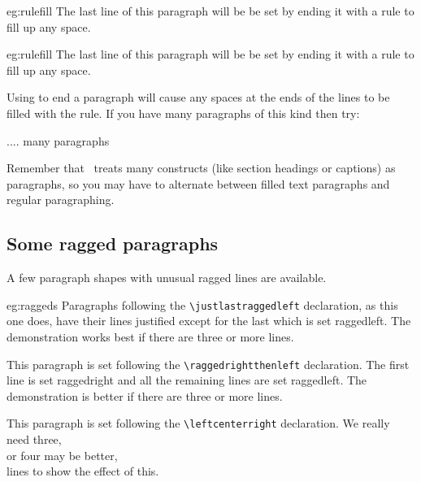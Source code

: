 \begin{egresult}{eg:rulefill}
The last line of this paragraph will be be set by ending it with
a rule to fill up any space.\lastlinerulefill
\end{egresult}


\begin{egsource}{eg:rulefill}
The last line of this paragraph will be be set by ending it with
a rule to fill up any space.\lastlinerulefill
\end{egsource}


Using \cmd{\lastlinerulefill} to end a paragraph will cause any spaces
at the ends of the lines to be filled with the \cmd{\lastlineparrule} rule.
If you have many paragraphs of this kind then try:
\begin{lcode}
\let\par\lastlinerulefill
.... many paragraphs
\let\par\memorigpar
\end{lcode}
Remember that \ltx\ treats many constructs (like section headings or captions)
as paragraphs, so you may have to alternate between filled text paragraphs
and regular paragraphing.



\subsection{Some ragged paragraphs}

   A few paragraph shapes with unusual ragged lines are available.

\begin{egresult}{eg:raggeds}
\justlastraggedleft
Paragraphs following the \verb?\justlastraggedleft? declaration, as
this one does, have their lines justified except for the last which
is set raggedleft. The demonstration works best if there are three
or more lines.

\raggedrightthenleft
This paragraph is set following the \verb?\raggedrightthenleft?
declaration. The first line is set raggedright and all the remaining
lines are set raggedleft. The demonstration is better if there are three or 
more lines.

\leftcenterright
This paragraph is set following the \verb?\leftcenterright?
declaration. We really need three, \\ or four may be better, \\
lines to show the effect of this.
\everypar{}
\end{egresult}



